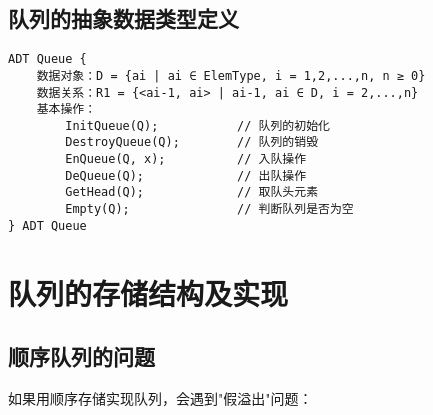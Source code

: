 \documentclass[12pt,a4paper]{amsart}
\begin{document}
\begin{center}
\end{center}

\subsection{队列的抽象数据类型定义}

\indent

\begin{lstlisting}[caption=队列的抽象数据类型定义]
ADT Queue {
    数据对象：D = {ai | ai ∈ ElemType, i = 1,2,...,n, n ≥ 0}
    数据关系：R1 = {<ai-1, ai> | ai-1, ai ∈ D, i = 2,...,n}
    基本操作：
        InitQueue(Q);           // 队列的初始化
        DestroyQueue(Q);        // 队列的销毁
        EnQueue(Q, x);          // 入队操作
        DeQueue(Q);             // 出队操作
        GetHead(Q);             // 取队头元素
        Empty(Q);               // 判断队列是否为空
} ADT Queue
\end{lstlisting}

\section{队列的存储结构及实现}

\subsection{顺序队列的问题}

如果用顺序存储实现队列，会遇到"假溢出"问题：
\end{document}
